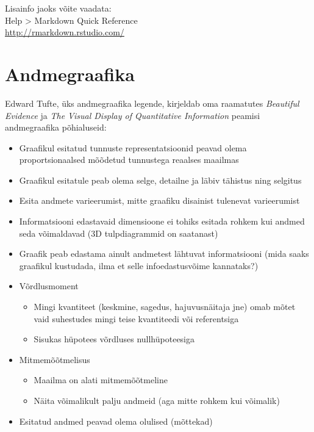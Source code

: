 \documentclass[
]{book}
\providecommand{\tightlist}{%
  \setlength{\itemsep}{0pt}\setlength{\parskip}{0pt}}
\begin{document}
Lisainfo jaoks võite vaadata:\\
Help \textgreater{} Markdown Quick Reference\\
\url{http://rmarkdown.rstudio.com/}

\hypertarget{andmegraafika}{%
\section{Andmegraafika}\label{andmegraafika}}

Edward Tufte, üks andmegraafika legende, kirjeldab oma raamatutes \emph{Beautiful Evidence} ja \emph{The Visual Display of Quantitative Information} peamisi andmegraafika põhialuseid:

\begin{itemize}
\tightlist
\item
  Graafikul esitatud tunnuste representatsioonid peavad olema proportsionaalsed mõõdetud tunnustega reaalses maailmas
\item
  Graafikul esitatule peab olema selge, detailne ja läbiv tähistus ning selgitus
\item
  Esita andmete varieerumist, mitte graafiku disainist tulenevat varieerumist
\item
  Informatsiooni edastavaid dimensioone ei tohiks esitada rohkem kui andmed seda võimaldavad (3D tulpdiagrammid on saatanast)
\item
  Graafik peab edastama ainult andmetest lähtuvat informatsiooni (mida saaks graafikul kustudada, ilma et selle infoedastusvõime kannataks?)
\item
  Võrdlusmoment

  \begin{itemize}
  \tightlist
  \item
    Mingi kvantiteet (keskmine, sagedus, hajuvusnäitaja jne) omab mõtet vaid suhestudes mingi teise kvantiteedi või referentsiga
  \item
    Sisukas hüpotees võrdluses nullhüpoteesiga
  \end{itemize}
\item
  Mitmemõõtmelisus

  \begin{itemize}
  \tightlist
  \item
    Maailma on alati mitmemõõtmeline
  \item
    Näita võimalikult palju andmeid (aga mitte rohkem kui võimalik)
  \end{itemize}
\item
  Esitatud andmed peavad olema olulised (mõttekad)
\end{itemize}
\end{document}
